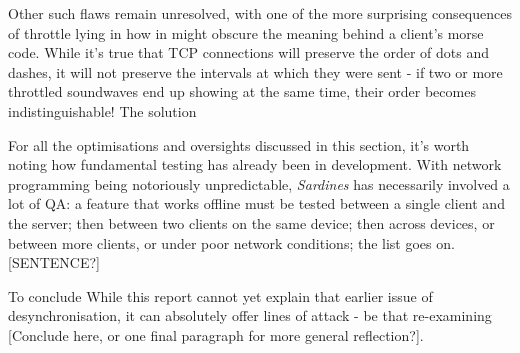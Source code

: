 \documentclass[a4paper, 10pt]{article}
\begin{document}
\begin{flushleft}
\vspace{5pt}\noindent
Other such flaws remain unresolved, with one of the more surprising consequences of throttle lying in how in might obscure the meaning behind a client's morse code. While it's true that TCP connections will preserve the order of dots and dashes, it will not preserve the intervals at which they were sent - if two or more throttled soundwaves end up showing at the same time, their order becomes indistinguishable! The solution 

\vspace{5pt}\noindent
For all the optimisations and oversights discussed in this section, it's worth noting how fundamental testing has already been in development. With network programming being notoriously unpredictable, \textit{Sardines} has necessarily involved a lot of QA: a feature that works offline must be tested between a single client and the server; then between two clients on the same device; then across devices, or between more clients, or under poor network conditions; the list goes on. [SENTENCE?]

\vspace{5pt}\noindent
To conclude
While this report cannot yet explain that earlier issue of desynchronisation, it can absolutely offer lines of attack - be that re-examining [Conclude here, or one final paragraph for more general reflection?]. 



\end{flushleft}
\end{document}
